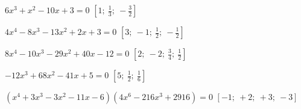 \begin{esercizio}[\Ast]
\begin{enumeratea}
 \item $6x^{3}+x^{2}-10x+3=0$ 
  \hfill $\left[1;~\frac{1}{3};~-\frac{3}{2}\right]$
 \item $4x^{4}-8x^{3}-13x^{2}+2x+3=0$ 
  \hfill $\left[3;~-1;~\frac{1}{2};~-\frac{1}{2}\right]$
 \item $8x^{4}-10x^{3}-29x^{2}+40x-12=0$ 
  \hfill $\left[2;~-2;~\frac{3}{4};~\frac{1}{2}\right]$
 \item $-12x^{3}+68x^{2}-41x+5=0$ 
  \hfill $\left[5;~\frac{1}{2};~\frac{1}{6}\right]$
 \item $(x^{4}+3x^{3}-3x^{2}-11x-6)(4x^{6}-216x^{3}+2916)=0$ 
  \hfill $\left[-1;~+2;~+3;~-3\right]$
\end{enumeratea}
\end{esercizio}

\subsubsection*{}

